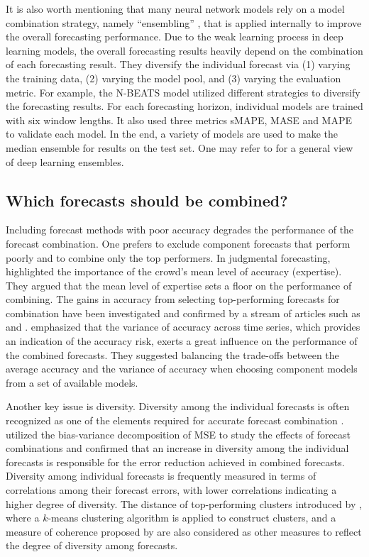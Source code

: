 \documentclass[a4paper,11pt]{article}
\begin{document}
It is also worth mentioning that many neural network models rely on a model combination strategy, namely ``ensembling'' \citep[see, e.g.,][a popular work in the machine learning context]{Caruana2004-en}, that is applied internally to improve the overall forecasting performance. Due to the weak learning process in deep learning models, the overall forecasting results heavily depend on the combination of each forecasting result. They diversify the individual forecast via (1) varying the training data, (2) varying the model pool, and (3) varying the evaluation metric. For example, the N-BEATS model \citep{oreshkin2019n} utilized different strategies to diversify the forecasting results. For each forecasting horizon, individual models are trained with six window lengths. It also used three metrics sMAPE, MASE and MAPE to validate each model. In the end, a variety of models are used to make the median ensemble for results on the test set. One may refer to \citet{ganaie2021ensemble} for a general view of deep learning ensembles.

\subsection{Which forecasts should be combined?}
\label{sec:forecasts}

Including forecast methods with poor accuracy degrades the performance of the forecast combination. One prefers to exclude component forecasts that perform poorly and to combine only the top performers. In judgmental forecasting, \citet{Mannes2014-dl} highlighted the importance of the crowd's mean level of accuracy (expertise). They argued that the mean level of expertise sets a floor on the performance of combining. The gains in accuracy from selecting top-performing forecasts for combination have been investigated and confirmed by a stream of articles such as \citet{Budescu2015-tu} and \citet{Kourentzes2019-na}. \citet{Lichtendahl2020-ut} emphasized that the variance of accuracy across time series, which provides an indication of the accuracy risk, exerts a great influence on the performance of the combined forecasts. They suggested balancing the trade-offs between the average accuracy and the variance of accuracy when choosing component models from a set of available models.

Another key issue is diversity. Diversity among the individual forecasts is often recognized as one of the elements required for accurate forecast combination \citep{Batchelor1995-ps,Brown2005-aa,Thomson2019-al}. \citet{Atiya2020-ge} utilized the bias-variance decomposition of MSE to study the effects of forecast combinations and confirmed that an increase in diversity among the individual forecasts is responsible for the error reduction achieved in combined forecasts. Diversity among individual forecasts is frequently measured in terms of correlations among their forecast errors, with lower correlations indicating a higher degree of diversity. The distance of top-performing clusters introduced by \citet{Lemke2010-wn}, where a $k$-means clustering algorithm is applied to construct clusters, and a measure of coherence proposed by \citet{Thomson2019-al} are also considered as other measures to reflect the degree of diversity among forecasts.
\end{document}
